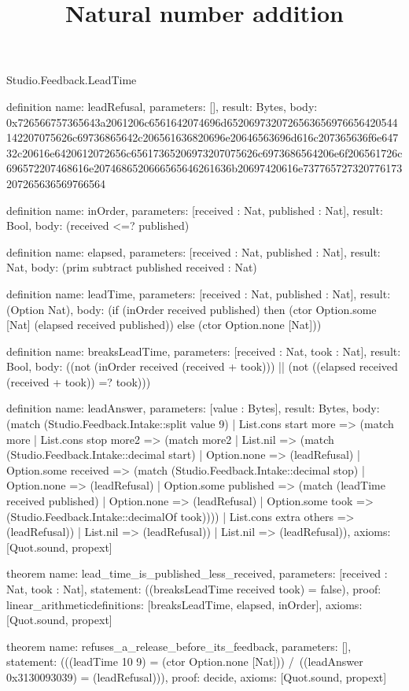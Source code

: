 \begin{lexlean}{Studio.Feedback.LeadTime}
\title{Natural number addition}
\begin{semanticmodule}
definition{
  name: leadRefusal,
  parameters: [],
  result: Bytes,
  body: 0x726566757365643a2061206c6561642074696d6520697320726563656976656420544142207075626c69736865642c206561636820696e20646563696d616c207365636f6e64732c20616e6420612072656c65617365206973207075626c6973686564206e6f206561726c696572207468616e2074686520666565646261636b20697420616e737765727320776173207265636569766564
}

definition{
  name: inOrder,
  parameters: [received : Nat, published : Nat],
  result: Bool,
  body: (received <=? published)
}

definition{
  name: elapsed,
  parameters: [received : Nat, published : Nat],
  result: Nat,
  body: (prim subtract published received : Nat)
}

definition{
  name: leadTime,
  parameters: [received : Nat, published : Nat],
  result: (Option Nat),
  body: (if (inOrder received published) then (ctor Option.some [Nat] (elapsed received published)) else (ctor Option.none [Nat]))
}

definition{
  name: breaksLeadTime,
  parameters: [received : Nat, took : Nat],
  result: Bool,
  body: ((not (inOrder received (received + took))) || (not ((elapsed received (received + took)) =? took)))
}

definition{
  name: leadAnswer,
  parameters: [value : Bytes],
  result: Bytes,
  body: (match (Studio.Feedback.Intake::split value 9)
    | List.cons start more => (match more
      | List.cons stop more2 => (match more2
        | List.nil => (match (Studio.Feedback.Intake::decimal start)
          | Option.none => (leadRefusal)
          | Option.some received => (match (Studio.Feedback.Intake::decimal stop)
            | Option.none => (leadRefusal)
            | Option.some published => (match (leadTime received published)
              | Option.none => (leadRefusal)
              | Option.some took => (Studio.Feedback.Intake::decimalOf took))))
        | List.cons extra others => (leadRefusal))
      | List.nil => (leadRefusal))
    | List.nil => (leadRefusal)),
  axioms: [Quot.sound, propext]
}

theorem{
  name: lead_time_is_published_less_received,
  parameters: [received : Nat, took : Nat],
  statement: ((breaksLeadTime received took) = false),
  proof: linear_arithmetic{definitions: [breaksLeadTime, elapsed, inOrder]},
  axioms: [Quot.sound, propext]
}

theorem{
  name: refuses_a_release_before_its_feedback,
  parameters: [],
  statement: (((leadTime 10 9) = (ctor Option.none [Nat])) /\ ((leadAnswer 0x3130093039) = (leadRefusal))),
  proof: decide{},
  axioms: [Quot.sound, propext]
}
\end{semanticmodule}
\end{lexlean}
